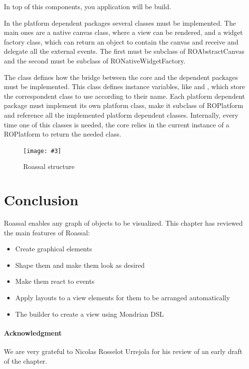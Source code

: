 \documentclass[a4paper,10pt,twoside]{book}
\newcommand{\fig}[4]{
		\begin{figure}[#1]
			\centering
			\texttt{[image: \#3]}
			\caption{\label{fig:#3}#4}
		\end{figure}}
\begin{document}
In top of this components, you application will be build.

In the platform dependent packages several classes must be implemented. The main ones are a native canvas class, where a view can be rendered, and a widget factory class, which can return an object to contain the canvas and receive and delegate all the external events.
The first must be subclass of ROAbstractCanvas and the second must be subclass of RONativeWidgetFactory.

The  class defines how the bridge between the core and the dependent packages must be implemented. This class defines instance variables, like  and , which store the correspondent class to use according to their name. Each platform dependent package must implement its own platform class, make it subclass of ROPlatform and reference all the implemented platform dependent classes.
Internally, every time one of this classes is needed, the core relies in the current instance of a ROPlatform to return the needed class.

\fig{H}{0.3}{structure}{Roassal structure}



\section{Conclusion}

Roassal enables any graph of objects to be visualized. This chapter has reviewed the main features of Roassal:

\begin{itemize}
\item Create graphical elements
\item Shape them and make them look as desired
\item Make them react to events
\item Apply layouts to a view elements for them to be arranged automatically 
\item The builder to create a view using Mondrian DSL
\end{itemize}

\paragraph{Acknowledgment}
We are very grateful to Nicolas Rosselot Urrejola for his review of an early draft of the chapter.

%
%


\ifx\wholebook\relax\else
   
   
\end{document}
